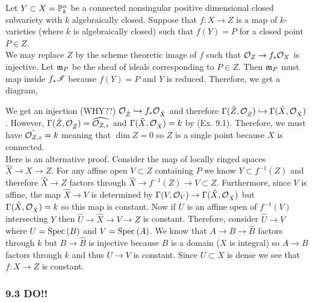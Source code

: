 \documentclass[12pt]{article}
\begin{document}
Let $Y \subset X = \P^n_k$ be a connected nonsingular positive dimensional closed subvariety with $k$ algebraically closed. Suppose that $f : X \to Z$ is a map of $k$-varieties (where $k$ is algebraically closed) such that $f(Y) = P$ for a closed point $P \in Z$.
\bigskip\\
We may replace $Z$ by the scheme theoretic image of $f$ such that $\struct{Z} \to f_* \struct{X}$ is injective. Let $\m_P$ be the sheaf of ideals corresponding to $P \in Z$. Then $\m_P$ must map inside $f_* \I$ because $f(Y) = P$ and $Y$ is reduced. Therefore, we get a diagram,
\begin{center}
\end{center} 
We get an injection (WHY??) $\struct{\hat{Z}} \embed f_* \struct{\hat{X}}$ and therefore $\Gamma(\hat{Z}, \struct{\hat{Z}}) \embed \Gamma(\hat{X}, \struct{\hat{X}})$. However, $\Gamma(\hat{Z}, \struct{\hat{Z}}) = \widehat{\stalk{Z}{z}}$ and $\Gamma(\hat{X}, \struct{\hat{X}}) = k$ by (Ex. 9.1). Therefore, we must have $\hat{\stalk{Z}{z}} = k$ meaning that $\dim{Z} = 0$ so $Z$ is a single point because $X$ is connected.
\bigskip\\
Here is an alternative proof. Consider the map of locally ringed spaces $\hat{X} \to X \to Z$. For any affine open $V \subset Z$ containing $P$ we know $Y \subset f^{-1}(Z)$ and therefore $\hat{X} \to Z$ factors through $\hat{X} \to f^{-1}(Z) \to V \subset Z$. Furthermore, since $V$ is affine, the map $\hat{X} \to V$ is determined by $\Gamma(V, \struct{V}) \to \Gamma(\hat{X}, \struct{\hat{X}})$ but $\Gamma(\hat{X}, \struct{\hat{X}}) = k$ so this map is constant. Now if $U$ is an affine open of $f^{-1}(V)$ intersecting $Y$ then $\hat{U} \to \hat{X} \to V \to Z$ is constant. Therefore, consider $\hat{U} \to V$ where $U = \Spec{B}$ and $V = \Spec{A}$. We know that $A \to B \to \hat{B}$ factors through $k$ but $B \to \hat{B}$ is injective because $B$ is a domain ($X$ is integral) so $A \to B$ factors through $k$ and thus $U \to V$ is constant. Since $U \subset X$ is dense we see that $f : X \to Z$ is constant.

\subsubsection{9.3 DO!!}
\end{document}
